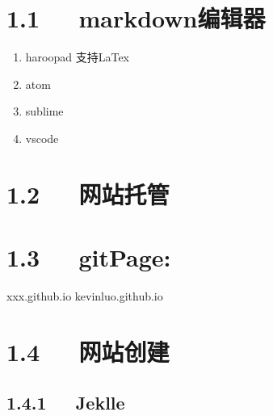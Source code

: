 \documentclass[letterpaper,12pt,english]{sphinxmanual}
\begin{document}
\section{1.1   markdown编辑器}
\label{\detokenize{001software/001install/001._u7f51_u7ad9/_u7f51_u7ad9_u76f8_u5173:markdown}}\begin{enumerate}
%
\item {} 
haroopad 支持LaTex

\item {} 
atom

\item {} 
sublime

\item {} 
vscode

\end{enumerate}


\section{1.2   网站托管}
\label{\detokenize{001software/001install/001._u7f51_u7ad9/_u7f51_u7ad9_u76f8_u5173:id3}}

\section{1.3   gitPage:}
\label{\detokenize{001software/001install/001._u7f51_u7ad9/_u7f51_u7ad9_u76f8_u5173:gitpage}}
xxx.github.io kevinluo.github.io


\section{1.4   网站创建}
\label{\detokenize{001software/001install/001._u7f51_u7ad9/_u7f51_u7ad9_u76f8_u5173:id4}}

\subsection{1.4.1   Jeklle}
\label{\detokenize{001software/001install/001._u7f51_u7ad9/_u7f51_u7ad9_u76f8_u5173:jeklle}}
\end{document}
